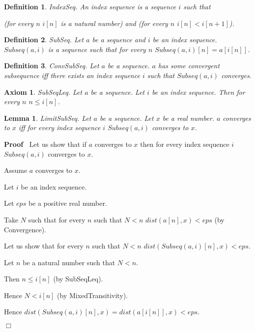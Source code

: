 \documentclass{article}
\newenvironment{forthel}{\begin{leftbar}}{\end{leftbar}}
\newenvironment{proof}{\noindent\textbf{Proof\ }}{\hspace*{\fill}$\Box$\medskip}
\newtheorem{axiom}{Axiom}
\newtheorem{lemma}{Lemma}
\newtheorem{definition}{Definition}
\begin{document}
\begin{forthel}
	
	\begin{definition}
		IndexSeq.
		An index sequence is a sequence $i$ such that
		
		(for every $n$ $i[n]$ is a natural number) and (for every $n$ $i[n] < i[n + 1]$).
	\end{definition}

	\begin{definition}
		SubSeq.
		Let $a$ be a sequence and $i$ be an index sequence. $Subseq(a,i)$ is a sequence such that for every $n$
		$Subseq(a,i)[n] = a[i[n]]$.
	\end{definition}
	
	\begin{definition}
		ConvSubSeq.
		Let $a$ be a sequence. $a$ has some convergent subsequence iff there exists an index sequence $i$ such that $Subseq(a,i)$ converges.
	\end{definition}
	
	\begin{axiom}
		SubSeqLeq.
		Let $a$ be a sequence. Let $i$ be an index sequence. Then for every $n$ $n \leq i[n]$.
	\end{axiom}
	
	\begin{lemma}
		LimitSubSeq.
		Let $a$ be a sequence. Let $x$ be a real number. $a$ converges to $x$ iff for every index sequence $i$ $Subseq(a,i)$ converges to $x$.
	\end{lemma}
	\begin{proof}
		Let us show that if $a$ converges to $x$ then for every index sequence $i$ $Subseq(a,i)$ converges to $x$.
		
			Assume $a$ converges to $x$.
			
			Let $i$ be an index sequence.
			
			Let $eps$ be a positive real number.
			
			Take $N$ such that for every $n$ such that $N < n$ $dist(a[n],x) < eps$ (by Convergence).
		
			Let us show that for every $n$ such that $N < n$ $dist(Subseq(a,i)[n],x) < eps$.
			
				Let $n$ be a natural number such that $N < n$.
				
				Then $n \leq i[n]$ (by SubSeqLeq).
				
				Hence $N < i[n]$ (by MixedTransitivity).
				
				Hence $dist(Subseq(a,i)[n],x) = dist(a[i[n]],x) < eps$.
				

\end{proof}
\end{forthel}
\end{document}
